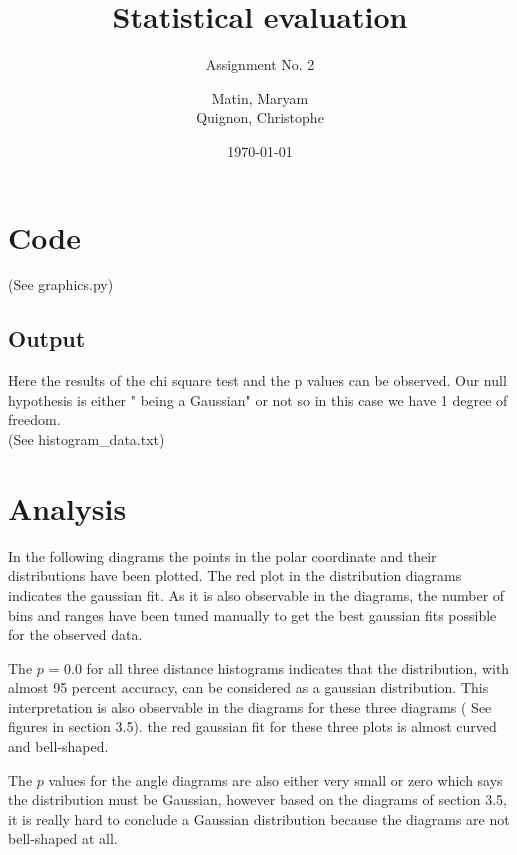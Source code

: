 \documentclass{scrartcl}
\begin{document}
\title{Statistical evaluation}
\subtitle{Assignment No. 2}
\author{
  Matin, Maryam \\
  Quignon, Christophe
}
\date{\today}


\maketitle


\section{Code}
(See graphics.py)


\subsection{Output}
Here the results of the chi square test and the p values can be observed. Our null hypothesis is either " being a Gaussian" or not so in this case we have 1 degree of freedom.
\\
(See histogram\_data.txt)



  
\section{Analysis}

In the following diagrams the points in the polar coordinate and their distributions have been plotted. The red plot in the distribution diagrams indicates the gaussian fit.  As it is also observable in the diagrams, the number of bins and ranges have been tuned manually to get the best gaussian fits possible for the observed data. 

The $p$ = 0.0 for all three distance histograms indicates that the distribution, with almost 95 percent accuracy, can be considered as a gaussian distribution. This interpretation is also observable in the diagrams for these three diagrams ( See figures in section 3.5). the red gaussian fit for these three plots is almost curved and bell-shaped. 

The $p$ values for the angle diagrams are also either very small or zero which says the distribution must be Gaussian, however based on the diagrams of section 3.5, it is really hard to conclude a Gaussian distribution because the diagrams are not bell-shaped at all.
\end{document}
